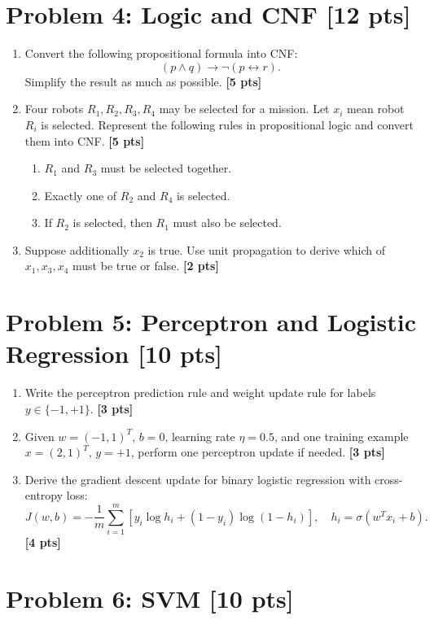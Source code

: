 \documentclass[UTF8,11pt,a4paper]{ctexart}
\newcommand{\pts}[1]{\hfill{\bfseries [#1 pts]}}
\begin{document}
\section*{Problem 4: Logic and CNF \pts{12}}

\begin{enumerate}[label=(\alph*)]
\item Convert the following propositional formula into CNF:
\[
(p\land q)\to \neg(p\leftrightarrow r).
\]
Simplify the result as much as possible. \pts{5}
\item Four robots $R_1,R_2,R_3,R_4$ may be selected for a mission. Let $x_i$ mean robot $R_i$ is selected. Represent the following rules in propositional logic and convert them into CNF. \pts{5}
\begin{enumerate}[label=(\roman*)]
\item $R_1$ and $R_3$ must be selected together.
\item Exactly one of $R_2$ and $R_4$ is selected.
\item If $R_2$ is selected, then $R_1$ must also be selected.
\end{enumerate}
\item Suppose additionally $x_2$ is true. Use unit propagation to derive which of $x_1,x_3,x_4$ must be true or false. \pts{2}
\end{enumerate}

\section*{Problem 5: Perceptron and Logistic Regression \pts{10}}

\begin{enumerate}[label=(\alph*)]
\item Write the perceptron prediction rule and weight update rule for labels $y\in\{-1,+1\}$. \pts{3}
\item Given $w=(-1,1)^T$, $b=0$, learning rate $\eta=0.5$, and one training example $x=(2,1)^T$, $y=+1$, perform one perceptron update if needed. \pts{3}
\item Derive the gradient descent update for binary logistic regression with cross-entropy loss:
\[
J(w,b)=-\frac1m\sum_{i=1}^m\left[y_i\log h_i+(1-y_i)\log(1-h_i)\right],
\quad h_i=\sigma(w^Tx_i+b).
\]
\pts{4}
\end{enumerate}

\section*{Problem 6: SVM \pts{10}}
\end{document}
